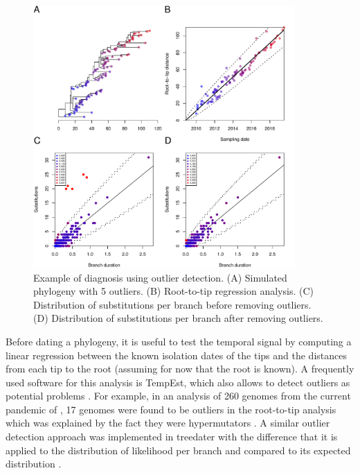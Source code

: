 \documentclass{article}
\begin{document}
\begin{figure}[p!]
\begin{center}
\includegraphics[width=10cm]{outlier.pdf}
\end{center}
\caption{Example of diagnosis using outlier detection.
(A) Simulated phylogeny with 5 outliers. 
(B) Root-to-tip regression analysis.
(C) Distribution of substitutions per branch before removing outliers.
(D) Distribution of substitutions per branch after removing outliers.
\label{fig:outlier}}
\end{figure}

Before dating a phylogeny, it is useful to test the temporal signal by computing a linear regression
between the known isolation dates of the tips and the distances from each tip to the root 
(assuming for now that the root is known). A frequently used software for this analysis is TempEst,
which also allows to detect outliers as potential problems \citep{Rambaut2016a}. 
For example, in an analysis of 260 genomes from the current pandemic of \citep{Vibrio cholerae},
17 genomes were found to be outliers in the root-to-tip analysis which was 
explained by the fact they were hypermutators \citep{Didelot2015}. A similar outlier detection
approach was implemented in treedater with the difference that it is 
applied to the distribution of likelihood per branch and compared to its expected distribution \citep{Volz2017}.
\end{document}
